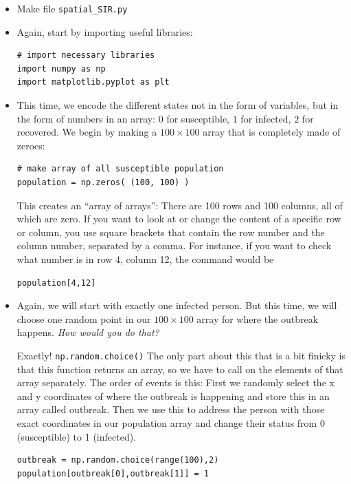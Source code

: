 \documentclass[pdflatex,a4paper]{article}
\begin{document}
\begin{itemize}
\item
Make file \verb=spatial_SIR.py=
\item
Again, start by importing useful libraries:
\begin{lstlisting}
# import necessary libraries
import numpy as np
import matplotlib.pyplot as plt
\end{lstlisting}
\item
This time, we encode the different states not in the form of variables, but in the form of numbers in an array: \(0\) for susceptible, \(1\) for infected, \(2\) for recovered. We begin by making a \(100\times 100\) array that is completely made of zeroes:

\begin{lstlisting}
# make array of all susceptible population
population = np.zeros( (100, 100) )
\end{lstlisting}

This creates an ``array of arrays'': There are 100 rows and 100 columns, all of which are zero. If you want to look at or change the content of a specific row or column, you use square brackets that contain the row number and the column number, separated by a comma. For instance, if you want to check what number is in row 4, column 12, the command would be

\begin{lstlisting}
population[4,12]
\end{lstlisting}


\item
Again, we will start with exactly one infected person. But this time, we will choose one random point in our \(100\times 100\) array for where the outbreak happens. \emph{How would you do that?}

\newpage

Exactly! \verb-np.random.choice()- The only part about this that is a bit finicky is that this function returns an array, so we have to call on the elements of that array separately. The order of events is this: First we randomly select the x and y coordinates of where the outbreak is happening and store this in an array called outbreak. Then we use this to address the person with those exact coordinates in our population array and change their status from 0 (susceptible) to 1 (infected).


\begin{lstlisting}
outbreak = np.random.choice(range(100),2)
population[outbreak[0],outbreak[1]] = 1
\end{lstlisting}


\end{itemize}
\end{document}
